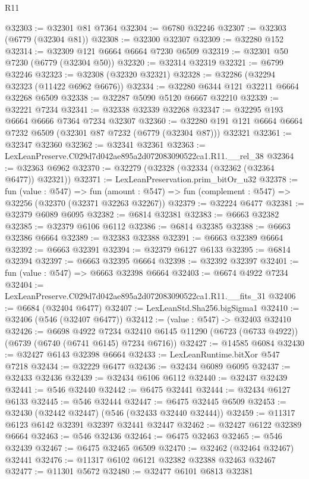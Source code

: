\begin{lexlean}{R11}
\begin{coremodule}
@32303 := @32301 @81 @7364
@32304 := @6780 @32246
@32307 := @32303 (@6779 (@32304 @81))
@32308 := @32300 @32307
@32309 := @32280 @152
@32314 := @32309 @121 @6664 @6664 @7230 @6509
@32319 := @32301 @50 @7230 (@6779 (@32304 @50))
@32320 := @32314 @32319
@32321 := @6799 @32246
@32323 := @32308 (@32320 @32321)
@32328 := @32286 (@32294 @32323 (@11422 @6962 @6676))
@32334 := @32280 @6344 @121 @32211 @6664 @32268 @6509
@32338 := @32287 @5090 @5120 @6667 @32210
@32339 := @32221 @7234
@32341 := @32338 @32339 @32268
@32347 := @32295 @193 @6664 @6666 @7364 @7234 @32307
@32360 := @32280 @191 @121 @6664 @6664 @7232 @6509 (@32301 @87 @7232 (@6779 (@32304 @87))) @32321
@32361 := @32347 @32360
@32362 := @32341 @32361
@32363 := LexLeanPreserve.C029d7d042ae895a2d072083090522ca1.R11.__rel_38
@32364 := @32363 @6962
@32370 := @32279 (@32328 (@32334 (@32362 (@32364 @6477)) @32321))
@32371 := LexLeanPreservation.prim_bitOr_u32
@32378 := fun (value : @547) =>
  fun (amount : @547) => fun (complement : @547) => @32256 (@32370 (@32371 @32263 @32267))
@32379 := @32224 @6477
@32381 := @32379 @6089 @6095
@32382 := @6814 @32381
@32383 := @6663 @32382
@32385 := @32379 @6106 @6112
@32386 := @6814 @32385
@32388 := @6663 @32386 @6664
@32389 := @32383 @32388
@32391 := @6663 @32389 @6664
@32392 := @6663 @32391
@32394 := @32379 @6127 @6133
@32395 := @6814 @32394
@32397 := @6663 @32395 @6664
@32398 := @32392 @32397
@32401 := fun (value : @547) => @6663 @32398 @6664
@32403 := @6674 @4922 @7234
@32404 := LexLeanPreserve.C029d7d042ae895a2d072083090522ca1.R11.__fits_31
@32406 := @6684 (@32404 @6477)
@32407 := LexLeanStd.Sha256.bigSigma1
@32410 := @32406 (@546 (@32407 @6477))
@32412 := (value : @547) -> @32403 @32410
@32426 := @6698
    @4922
    @7234
    @32410
    @6145
    @11290
    (@6723 (@6733 @4922))
    (@6739 (@6740 (@6741 @6145) @7234 @6716))
@32427 := @14585 @6084
@32430 := @32427 @6143 @32398 @6664
@32433 := LexLeanRuntime.bitXor @547 @7218
@32434 := @32229 @6477
@32436 := @32434 @6089 @6095
@32437 := @32433 @32436
@32439 := @32434 @6106 @6112
@32440 := @32437 @32439
@32441 := @546 @32440
@32442 := @6475 @32441
@32444 := @32434 @6127 @6133
@32445 := @546 @32444
@32447 := @6475 @32445 @6509
@32453 := @32430 (@32442 @32447) (@546 (@32433 @32440 @32444))
@32459 := @11317 @6123 @6142 @32391 @32397 @32441 @32447
@32462 := @32427 @6122 @32389 @6664
@32463 := @546 @32436
@32464 := @6475 @32463
@32465 := @546 @32439
@32467 := @6475 @32465 @6509
@32470 := @32462 (@32464 @32467) @32441
@32476 := @11317 @6102 @6121 @32382 @32388 @32463 @32467
@32477 := @11301 @5672
@32480 := @32477 @6101 @6813 @32381

\end{coremodule}
\end{lexlean}
